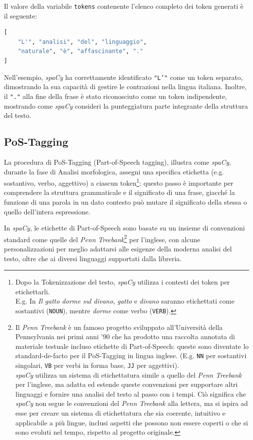 \documentclass[12pt]{report}
\newcommand{\spacy}{\textsl{spaCy}\xspace}
\begin{document}
\begin{mdframed}
\small
Il valore della variabile \texttt{tokens} contenente l'elenco completo dei token generati è il seguente:

\begin{lstlisting}[language=Python]
[
    "L'", "analisi", "del", "linguaggio",
    "naturale", "è", "affascinante", "."
]
\end{lstlisting}
\end{mdframed}

\noindent Nell'esempio, \spacy ha correttamente identificato \texttt{"L'"} come un token separato, dimostrando la sua capacità di gestire le contrazioni nella lingua italiana. Inoltre, il \texttt{"."} alla fine della frase è stato riconosciuto come un token indipendente, mostrando come \spacy consideri la punteggiatura parte integrante della struttura del testo.


\subsection{PoS-Tagging}
La procedura di PoS-Tagging (Part-of-Speech tagging), illustra come \spacy, durante la fase di \textsf{Analisi morfologica}, assegni una specifica etichetta (e.g. sostantivo, verbo, aggettivo) a ciascun token\footnote{Dopo la Tokenizzazione del testo, \spacy utilizza i contesti dei token per etichettarli.\\
E.g. In \textit{Il gatto dorme sul divano}, \textit{gatto} e \textit{divano} saranno etichettati come sostantivi (\texttt{NOUN}), mentre \textit{dorme} come verbo (\texttt{VERB}).}: questo passo è importante per comprendere la struttura grammaticale e il significato di una frase, giacché la funzione di una parola in un dato contesto può mutare il significato della stessa o quello dell'intera espressione.

In \spacy, le etichette di Part-of-Speech sono basate su un insieme di convenzioni standard come quelle del \textit{Penn Treebank}\footnote{Il \textit{Penn Treebank} è un famoso progetto sviluppato all'Università della Pennsylvania nei primi anni '90 che ha prodotto una raccolta annotata di materiale testuale incluso etichette di Part-of-Speech: queste sono diventate lo standard-de-facto per il PoS-Tagging in lingua inglese. (E.g. \texttt{NN} per sostantivi singolari, \texttt{VB} per verbi in forma base, \texttt{JJ} per aggettivi).\\
\spacy utilizza un sistema di etichettatura simile a quello del \textit{Penn Treebank} per l'inglese, ma adatta ed estende queste convenzioni per supportare altri linguaggi e fornire una analisi del testo al passo con i tempi. Ciò significa che \spacy non segue le convenzioni del \textit{Penn Treebank} alla lettera, ma si ispira ad esse per creare un sistema di etichettatura che sia coerente, intuitivo e applicabile a più lingue, inclusi aspetti che possono non essere coperti o che si sono evoluti nel tempo, rispetto al progetto originale.} per l'inglese, con alcune personalizzazioni per meglio adattarsi alle esigenze della moderna analisi del testo, oltre che ai diversi linguaggi supportati dalla libreria.
\end{document}
